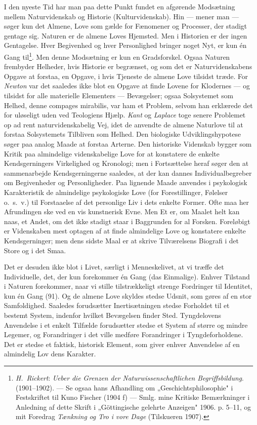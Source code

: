 \documentclass[12pt,a4paper]{book}
\newcommand{\apage}[1]{\marginnote{\footnotesize\textit{[#1]}}}
\begin{document}
I den nyeste Tid har man paa dette Punkt fundet en afgørende Modsætning mellem
Naturvidenskab og Historie (Kulturvidenskab). Hin --- mener man --- søger kun det
Almene, Love som gælde for Fænomener og Processer, der stadigt gentage sig. Naturen
er de almene Loves Hjemsted. Men i Historien er der ingen Gentagelse. Hver
Begivenhed og hver Personlighed bringer noget Nyt, er kun én Gang til\footnote{\emph{H.\
Rickert}: \emph{Ueber die Grenzen der Naturwissenschaftlichen Begriffsbildung}.
(1901--1902). --- Se ogsaa hans Afhandling om „Geschichtsphilosophie" i Festskriftet
til Kuno Fischer (1904 f) --- Smlg. mine Kritiske Bemærkninger i Anledning af dette
Skrift i „Göttingische gelehrte Anzeigen" 1906. p. 5--11, og mit Foredrag
\emph{Tænkning og Tro i vore Dage} (Tilskueren 1907).}. Men denne Modsætning er kun
en Gradsforskel. Ogsaa Naturen frembyder Helheder, hvis Historie er begrænset, \apage{225} og
som det er Naturvidenskabens Opgave at forstaa, en Opgave, i hvis Tjeneste de almene
Love tilsidst træde. For \emph{Newton} var det saaledes ikke blot en Opgave at finde
Lovene for Klodernes --- og tilsidst for alle materielle Elementers --- Bevægelser;
ogsaa Solsystemet som Helhed, denne compages mirabilis, var ham et Problem, selvom
han erklærede det for uløseligt uden ved Teologiens Hjælp. \emph{Kant} og
\emph{Laplace} toge senere Problemet op ad rent naturvidenskabelig Vej, idet de
anvendte de almene Naturlove til at forstaa Solsystemets Tilbliven som Helhed. Den
biologiske Udviklingshypotese søger paa analog Maade at forstaa Arterne. Den
historiske Videnskab bygger som Kritik paa almindelige videnskabelige Love for at
konstatere de enkelte Kendsgerningers Virkelighed og Kronologi; men i Fortsættelse
heraf søger den at sammenarbejde Kendsgerningerne saaledes, at der kan dannes
Individualbegreber om Begivenheder og Personligheder. Paa lignende Maade anvendes i
psykologisk Karakteristik de almindelige psykologiske Love (for Forestillinger,
Følelser o.\ s.\ v.) til Forstaaelse af det personlige Liv i dets enkelte Former.
Ofte maa her Afrundingen ske ved en vis kunstnerisk Evne. Men Et er, om Maalet helt
kan naas, et Andet, om det ikke stadigt staar i Baggrunden for al Forsken.
Foreløbigt er Videnskaben mest optagen af at finde almindelige Love og konstatere
enkelte Kendsgerninger; men dens sidste Maal er at skrive Tilværelsens Biografi i
det Store og i det Smaa.

Det er desuden ikke blot i Livet, særligt i Menneskelivet, at vi træffe det
Individuelle, det, der kun forekommer én Gang (das Einmalige). Enhver Tilstand i
Naturen forekommer, naar vi stille tilstrækkeligt strenge Fordringer til Identitet,
kun én Gang (91). Og de almene Love skyldes stedse Udsnit, som gøres af en stor
Samfoldighed. Saaledes forudsætter Inertisætningen stedse Forholdet til et bestemt
System, indenfor hvilket Bevægelsen finder Sted. Tyngdelovens Anvendelse i et enkelt
Tilfælde forudsætter stedse et System af større og mindre Legemer, og Forandringer i
det ville medføre Forandringer i Tyngdeforholdene. Det er \apage{226} stedse et faktisk,
historisk Element, som giver enhver Anvendelse af en almindelig Lov dens Karakter.
\end{document}
